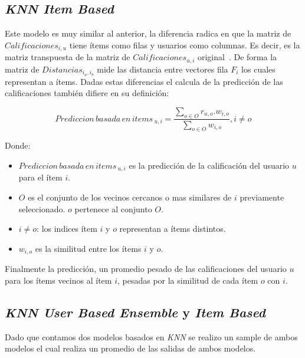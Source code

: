 \documentclass[11pt,a4paper,twoside]{thesis}
\begin{document}
\subsection{\textit{KNN Item Based}}

Este modelo es muy similar al anterior, la diferencia radica en que la matriz
de $Calificaciones_{i, u}$ tiene ítems como filas y usuarios como columnas. Es
decir, es la matriz transpuesta de la matriz de $Calificaciones_{u, i}$
original~\cite{useritembasedinference}. De forma la matriz de
$Distancias_{i_a,i_b}$ mide las distancia entre vectores fila $F_i$ los cuales
representan a ítems. Dadas estas diferencias el calcula de la predicción de las
calificaciones también difiere en su definición:

\begin{equation}
	Prediccion \mspace{3mu}basada \mspace{3mu}en \mspace{3mu}items\mspace{3mu}_{u, i} = \frac{\sum_{o \in O} r_{u, o}. w_{i, o} }{\sum_{o \in O} w_{i, o} }, i \neq o
\end{equation}
\begin{description}
	\item[Donde:]
\end{description}
\begin{itemize}
	\item $Prediccion \mspace{3mu}basada \mspace{3mu}en \mspace{3mu}items\mspace{3mu}_{u, i}$ es la predicción de la calificación del usuario $u$ para el ítem $i$.
	\item $O$ es el conjunto de los vecinos cercanos o mas similares de $i$ previamente seleccionado. $o$ pertenece al conjunto $O$.
	\item $i \neq o$: los indices ítem $i$ y $o$ representan a ítems distintos.
	\item $w_{i,o}$ es la similitud entre los ítems $i$ y $o$.
\end{itemize}

Finalmente la predicción, un promedio pesado de las calificaciones del usuario
$u$ para los ítems vecinos al ítem $i$, pesadas por la similitud de cada ítem
$o$ con $i$.

\subsection{\textit{KNN User Based Ensemble} y \textit{Item Based}}

Dado que contamos dos modelos basados en \textit{KNN} se realizo un sample de
ambos modelos el cual realiza un promedio de las salidas de ambos modelos.
\end{document}

